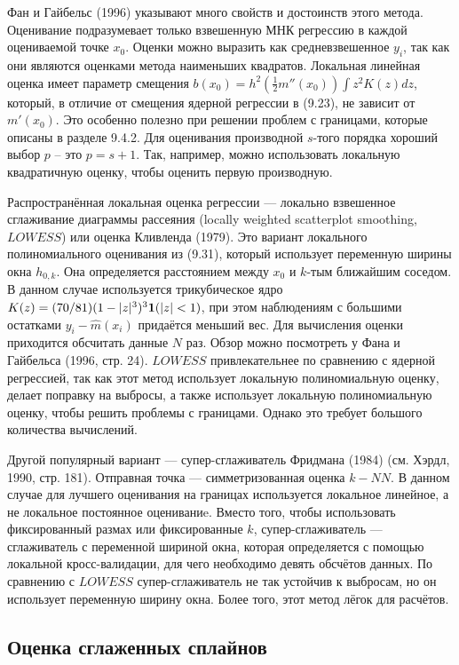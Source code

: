Фан и Гайбельс (1996) указывают много свойств и достоинств этого метода. Оценивание подразумевает только взвешенную МНК регрессию в каждой оцениваемой точке $x_0$. Оценки можно выразить как средневзвешенное $y_i$, так как они являются оценками метода наименьших квадратов. Локальная линейная оценка имеет параметр смещения $b(x_0) = h^2(\frac{1}{2}m''(x_0))\int z^2 K(z)dz$, который, в отличие от смещения ядерной регрессии в (9.23), не зависит от $m'(x_0)$. Это особенно полезно при решении проблем с границами, которые описаны в разделе 9.4.2. Для оценивания производной $s$-того порядка хороший выбор $p$ -- это $p = s + 1$. Так, например, можно использовать локальную квадратичную оценку, чтобы оценить первую производную.

Распространённая локальная оценка регрессии --- локально взвешенное сглаживание диаграммы рассеяния  (locally weighted scatterplot smoothing, $LOWESS$) или оценка Кливленда (1979). Это вариант локального полиномиального оценивания из (9.31), который использует переменную ширины окна $h_{0,k}$. Она определяется расстоянием между $x_0$ и $k$-тым ближайшим соседом. В данном случае используется трикубическое ядро $K(z) = (70/81)(1 - |z|^3)^3{\bf{1}}(|z| < 1)$, при этом наблюдениям с большими остатками $y_i - \hat{m}(x_i)$ придаётся меньший вес. Для вычисления оценки приходится обсчитать данные $N$ раз. Обзор можно посмотреть у Фана и Гайбельса (1996, стр. 24). $LOWESS$ привлекательнее по сравнению с ядерной регрессией, так как этот метод использует локальную полиномиальную оценку, делает поправку на выбросы, а также использует локальную полиномиальную оценку, чтобы решить проблемы с границами. Однако это требует большого количества вычислений.

Другой популярный вариант --- супер-сглаживатель Фридмана (1984) (см. Хэрдл, 1990, стр. 181). Отправная точка --- симметризованная оценка $k - NN$. В данном случае для лучшего оценивания на границах используется локальное линейное, а не локальное постоянное оцениваниe. Вместо того, чтобы использовать фиксированный размах или фиксированные $k$, супер-сглаживатель --- сглаживатель с переменной шириной окна, которая определяется с помощью локальной кросс-валидации, для чего необходимо девять обсчётов данных. По сравнению с $LOWESS$ супер-сглаживатель не так устойчив к выбросам, но он использует переменную ширину окна. Более того, этот метод лёгок для расчётов.

\subsection{Оценка сглаженных сплайнов}

